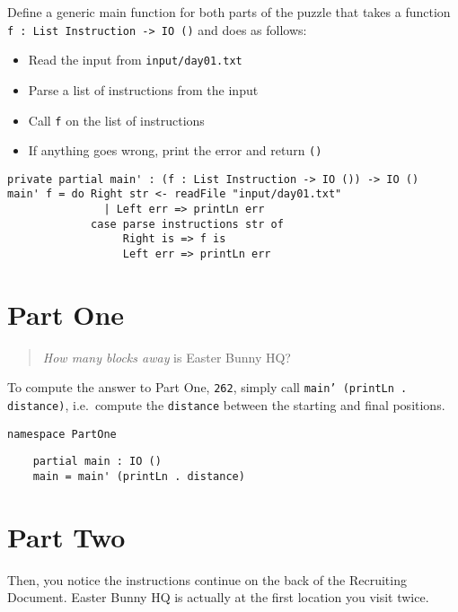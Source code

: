 Define a generic main function for both parts of the puzzle that takes a
function \texttt{f : List Instruction -> IO ()} and does as
follows:

\begin{itemize}
\tightlist
\item
  Read the input from \texttt{input/day01.txt}
\item
  Parse a list of instructions from the input
\item
  Call \texttt{f} on the list of instructions
\item
  If anything goes wrong, print the error and return
  \texttt{()}
\end{itemize}

\begin{verbatim}
private partial main' : (f : List Instruction -> IO ()) -> IO ()
main' f = do Right str <- readFile "input/day01.txt"
               | Left err => printLn err
             case parse instructions str of
                  Right is => f is
                  Left err => printLn err
\end{verbatim}

\section{Part One}\label{part-one}

\begin{quote}
  \textit{How many blocks away} is Easter Bunny HQ?
\end{quote}

To compute the answer to Part One, \texttt{262}, simply
call \texttt{main' (printLn . distance)}, i.e.~compute the
\texttt{distance} between the starting and final positions.

\begin{verbatim}
namespace PartOne
\end{verbatim}

\begin{verbatim}
    partial main : IO ()
    main = main' (printLn . distance)
\end{verbatim}

\newpage

\section{Part Two}\label{part-two}

Then, you notice the instructions continue on the back of the Recruiting
Document. Easter Bunny HQ is actually at the first location you visit
twice.

